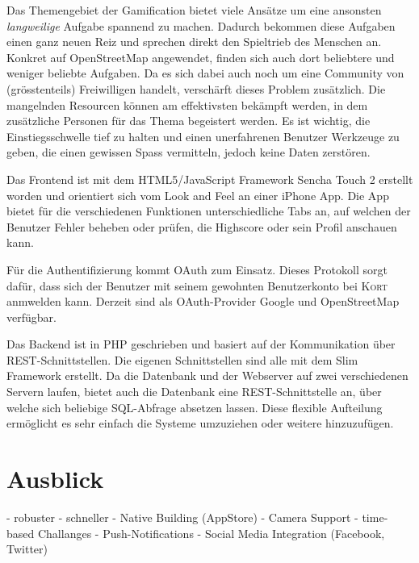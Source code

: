 Das Themengebiet der Gamification bietet viele Ansätze um eine ansonsten \emph{langweilige} Aufgabe spannend zu machen.
Dadurch bekommen diese Aufgaben einen ganz neuen Reiz und sprechen direkt den Spieltrieb des Menschen an.
Konkret auf OpenStreetMap angewendet, finden sich auch dort beliebtere und weniger beliebte Aufgaben.
Da es sich dabei auch noch um eine Community von (grösstenteils) Freiwilligen handelt, verschärft dieses Problem zusätzlich.
Die mangelnden Resourcen können am effektivsten bekämpft werden, in dem zusätzliche Personen für das Thema begeistert werden.
Es ist wichtig, die Einstiegsschwelle tief zu halten und einen unerfahrenen Benutzer Werkzeuge zu geben, die einen gewissen Spass vermitteln, jedoch keine Daten zerstören.

Das Frontend ist mit dem HTML5/JavaScript Framework Sencha Touch 2 erstellt worden und orientiert sich vom Look and Feel an einer iPhone App.
Die App bietet für die verschiedenen Funktionen unterschiedliche Tabs an, auf welchen der Benutzer Fehler beheben oder prüfen, die Highscore oder sein Profil anschauen kann.

Für die Authentifizierung kommt \gls{OAuth} zum Einsatz.
Dieses Protokoll sorgt dafür, dass sich der Benutzer mit seinem gewohnten Benutzerkonto bei \textsc{Kort} anmwelden kann.
Derzeit sind als OAuth-Provider Google und OpenStreetMap verfügbar.

Das Backend ist in PHP geschrieben und basiert auf der Kommunikation über \gls{REST}-Schnittstellen.
Die eigenen Schnittstellen sind alle mit dem Slim Framework erstellt.
Da die Datenbank und der Webserver auf zwei verschiedenen Servern laufen, bietet auch die Datenbank eine REST-Schnittstelle an, über welche sich beliebige SQL-Abfrage absetzen lassen.
Diese flexible Aufteilung ermöglicht es sehr einfach die Systeme umzuziehen oder weitere hinzuzufügen.


\section*{Ausblick}
- robuster
- schneller
- Native Building (AppStore)
- Camera Support
- time-based Challanges
- Push-Notifications
- Social Media Integration (Facebook, Twitter)